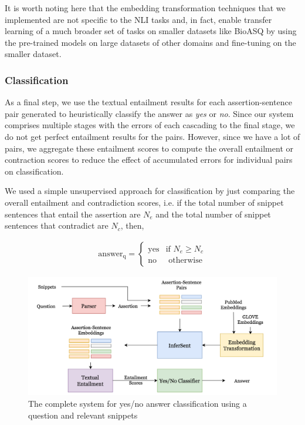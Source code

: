 \documentclass[11pt,a4paper]{article}
\begin{document}
    It is worth noting here that the embedding transformation techniques that we implemented are not specific to the NLI tasks and, in fact, enable transfer learning of a much broader set of tasks on smaller datasets like BioASQ by using the pre-trained models on large datasets of other domains and fine-tuning on the smaller dataset.
    

    \subsubsection{Classification}
    
    As a final step, we use the textual entailment results for each assertion-sentence pair generated to heuristically classify the answer as \textit{yes} or \textit{no}. Since our system comprises multiple stages with the errors of each cascading to the final stage, we do not get perfect entailment results for the pairs. However, since we have a lot of pairs, we aggregate these entailment scores to compute the overall entailment or contraction scores to reduce the effect of accumulated errors for individual pairs on classification.
    
    We used a simple unsupervised approach for classification by just comparing the overall entailment and contradiction scores, i.e. if the total number of snippet sentences that entail the assertion are $N_e$ and the total number of snippet sentences that contradict are $N_c$, then, 
    
    \begin{align*}
        \text{answer}_{\text{q}} = \begin{cases}
        \text{yes} & \text{if } N_e \ge N_c \\
        \text{no} & \text{ otherwise}
        \end{cases}
    \end{align*}

    \begin{figure}[t!]
        \centering
        \includegraphics[scale=0.3]{images/YesNoPipeline.png}
        \caption{The complete system for yes/no answer classification using a question and relevant snippets}
        \label{fig:yesno_pipeline}
    \end{figure}
\end{document}
